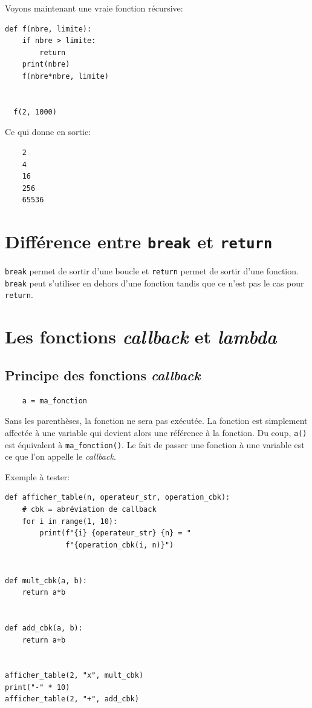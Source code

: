 \documentclass[a4paper,12pt]{book}
\begin{document}
Voyons maintenant une vraie fonction récursive:
\begin{lstlisting}[caption=Fonction récursive]
  def f(nbre, limite):
    if nbre > limite:
        return
    print(nbre)
    f(nbre*nbre, limite)
  
  
  f(2, 1000)
\end{lstlisting}
\medskip

Ce qui donne en sortie:
\begin{verbatim}
    2
    4
    16
    256
    65536
\end{verbatim}
\medskip

\section{Différence entre \texttt{break} et \texttt{return}}
\texttt{break} permet de sortir d'une boucle et \texttt{return} permet de sortir d'une fonction. \texttt{break} peut s'utiliser en dehors d'une fonction tandis que ce n'est pas le cas pour \texttt{return}.
\medskip

\section{Les fonctions \textit{callback} et \textit{lambda}}
\subsection*{Principe des fonctions \textit{callback}}
\begin{verbatim}
    a = ma_fonction
\end{verbatim}
\medskip

Sans les parenthèses, la fonction ne sera pas exécutée. La fonction est simplement affectée à une variable qui devient alors une référence à la fonction. Du coup, \verb|a()| est équivalent à \verb|ma_fonction()|. Le fait de passer une fonction à une variable est ce que l'on appelle le \textit{callback}.
\medskip

Exemple à tester:
\begin{lstlisting}[caption=Le \textit{callback}]
def afficher_table(n, operateur_str, operation_cbk):  
    # cbk = abréviation de callback
    for i in range(1, 10):
        print(f"{i} {operateur_str} {n} = "
              f"{operation_cbk(i, n)}")
  
  
def mult_cbk(a, b):
    return a*b


def add_cbk(a, b):
    return a+b


afficher_table(2, "x", mult_cbk)
print("-" * 10)
afficher_table(2, "+", add_cbk)
\end{lstlisting}
\medskip
\end{document}
